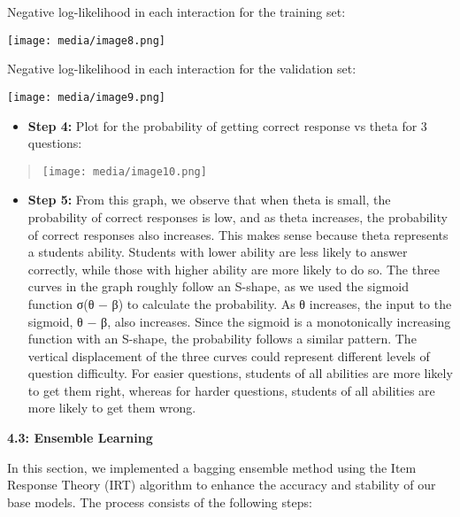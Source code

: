 Negative log-likelihood in each interaction for the training set:

\texttt{[image: media/image8.png]}

Negative log-likelihood in each interaction for the validation set:

\texttt{[image: media/image9.png]}

\begin{itemize}
\item
  \textbf{Step 4:} Plot for the probability of getting correct response
  vs theta for 3 questions:
\end{itemize}

\begin{quote}
\texttt{[image: media/image10.png]}
\end{quote}

\begin{itemize}
\item
  \textbf{Step 5:} From this graph, we observe that when theta is small,
  the probability of correct responses is low, and as theta increases,
  the probability of correct responses also increases. This makes sense
  because theta represents a student\textquotesingle s ability. Students
  with lower ability are less likely to answer correctly, while those
  with higher ability are more likely to do so. The three curves in the
  graph roughly follow an S-shape, as we used the sigmoid function σ(θ −
  β) to calculate the probability. As θ increases, the input to the
  sigmoid, θ − β, also increases. Since the sigmoid is a monotonically
  increasing function with an S-shape, the probability follows a similar
  pattern. The vertical displacement of the three curves could represent
  different levels of question difficulty. For easier questions,
  students of all abilities are more likely to get them right, whereas
  for harder questions, students of all abilities are more likely to get
  them wrong.
\end{itemize}

\textbf{4.3: Ensemble Learning}

In this section, we implemented a bagging ensemble method using the Item
Response Theory (IRT) algorithm to enhance the accuracy and stability of
our base models. The process consists of the following steps:

